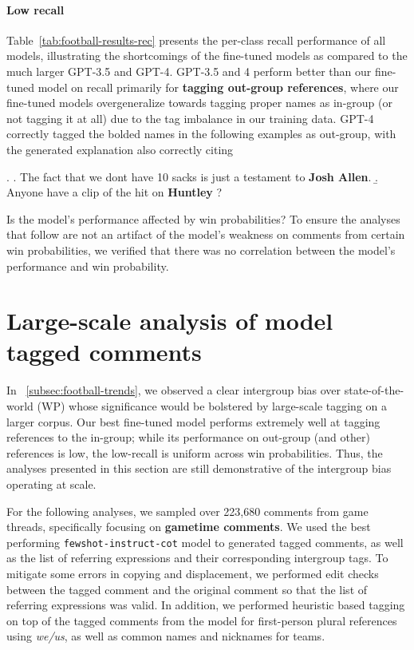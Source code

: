 \paragraph{Low recall} Table~\ref{tab:football-results-rec} presents the per-class recall performance of all models, illustrating the shortcomings of the fine-tuned models as compared to the much larger GPT-3.5 and GPT-4. GPT-3.5 and 4 perform better than our fine-tuned model on recall primarily for \textbf{tagging out-group references}, where our fine-tuned models overgeneralize towards tagging proper names as in-group (or not tagging it at all) due to the tag imbalance in our training data. GPT-4 correctly tagged the bolded names in the following examples as out-group, with the generated explanation also correctly citing 

\ex. \a. The fact that we dont have 10 sacks is just a testament to \textbf{Josh Allen}.
     \b. Anyone have a clip of the hit on \textbf{Huntley} ?



Is the model's performance affected by win probabilities? To ensure the analyses that follow are not an artifact of the model's weakness on comments from certain win probabilities, we verified that there was no correlation between the model's performance and win probability.

\section{Large-scale analysis of model tagged comments}
\label{sec:football-analysis}

In \textsection~\ref{subsec:football-trends}, we observed a clear intergroup bias over state-of-the-world (WP) whose significance would be bolstered by large-scale tagging on a larger corpus. Our best fine-tuned model performs extremely well at tagging references to the in-group; while its performance on out-group (and other) references is low, the low-recall is uniform across win probabilities. Thus, the analyses presented in this section are still demonstrative of the intergroup bias operating at scale.

For the following analyses, we sampled over 223,680 comments from game threads, specifically focusing on \textbf{gametime comments}. We used the best performing \texttt{fewshot-instruct-cot} model to generated tagged comments, as well as the list of referring expressions and their corresponding intergroup tags. To mitigate some errors in copying and displacement, we performed edit checks between the tagged comment and the original comment so that the list of referring expressions was valid. In addition, we performed heuristic based tagging on top of the tagged comments from the model for first-person plural references using \emph{we/us}, as well as common names and nicknames for teams.

